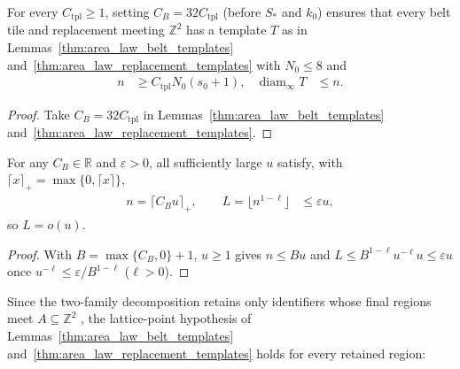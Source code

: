 \begin{lemma}
    \label{thm:area_law_belt_replacement_templates}
    \leanok
    For every $C_{\mathrm{tpl}}\ge1$, setting $C_B=32C_{\mathrm{tpl}}$ (before
    $S_*$ and $k_0$) ensures that every belt tile and replacement meeting
    $\mathbb Z^2$ has a template $T$ as in Lemmas~\ref{thm:area_law_belt_templates}
    and~\ref{thm:area_law_replacement_templates} with $N_0\le8$ and
    \begin{align}
        n                            & \ge C_{\mathrm{tpl}}N_0(s_0+1), &
        \operatorname{diam}_\infty T & \le n.
        \label{eq:area_law_belt_replacement_template_bounds}
    \end{align}
\end{lemma}
\begin{proof}\leanok
    Take $C_B=32C_{\mathrm{tpl}}$ in Lemmas~\ref{thm:area_law_belt_templates}
    and~\ref{thm:area_law_replacement_templates}.
\end{proof}

\begin{lemma}
    \label{thm:area_law_belt_replacement_scale_limit}
    \leanok
    For any $C_B\in\mathbb R$ and $\varepsilon>0$, all sufficiently large $u$
    satisfy, with $\lceil x\rceil_+=\max\{0,\lceil x\rceil\}$,
    \begin{align}
        n=\lceil C_Bu\rceil_+,\qquad
        L=\bigl\lfloor n^{1-\ell}\bigr\rfloor & \le\varepsilon u,
        \label{eq:area_law_belt_replacement_scale_limit}
    \end{align}
    so $L=o(u)$.
\end{lemma}
\begin{proof}\leanok
    With $B=\max\{C_B,0\}+1$, $u\ge1$ gives $n\le Bu$ and
    $L\le B^{1-\ell}u^{-\ell}u\le\varepsilon u$ once
    $u^{-\ell}\le\varepsilon/B^{1-\ell}$ ($\ell>0$).
\end{proof}

Since the two-family decomposition retains only identifiers whose final regions
meet $A\subseteq\mathbb Z^2$ \cite[Section~11]{OpenAI2026AreaLaw}, the lattice-point
hypothesis of Lemmas~\ref{thm:area_law_belt_templates}
and~\ref{thm:area_law_replacement_templates} holds for every retained region:

